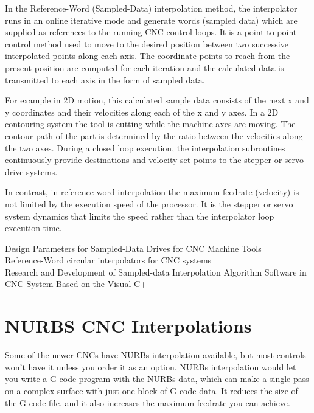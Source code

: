 In the Reference-Word (Sampled-Data) interpolation method, the interpolator runs in an online iterative mode and generate words (sampled data) which are supplied as references to the running CNC control loops. It is a point-to-point control method used to move to the desired position between two successive interpolated points along each axis. The coordinate points to reach from the present position are computed for each iteration and the calculated data is transmitted to each axis in the form of sampled data. 
\vspace*{1\baselineskip}

For example in 2D motion, this calculated sample data consists of the next x and y coordinates and their velocities along each of the x and y axes. In a 2D contouring system the tool is cutting while the machine axes are moving. The contour path of the part is determined by the ratio between the velocities along the two axes. During a closed loop execution, the interpolation subroutines continuously provide destinations and velocity set points to the stepper or servo drive systems. 
\vspace*{1\baselineskip}

In contrast, in reference-word interpolation the maximum feedrate (velocity) is not limited by the execution speed of the processor. It is the stepper or servo system dynamics that limits the speed rather than the interpolator loop execution time.
\vspace*{1\baselineskip}

\begin{tcolorbox}
	
\cite{Koren_1978} Design Parameters for Sampled-Data Drives for CNC Machine Tools\\
\cite{Koren_1982} Reference-Word circular interpolators for CNC systems\\
\cite{Yang_2018}  Research and Development of Sampled-data Interpolation Algorithm Software in CNC System Based on the Visual C++ \\

\end{tcolorbox}

\section{NURBS CNC Interpolations}

Some of the newer CNCs have NURBs interpolation available, but most controls won't have it unless you order it as an option. NURBs interpolation would let you write a G-code program with the NURBs data, which can make a single pass on a complex surface with just one block of G-code data. It reduces the size of the G-code file, and it also increases the maximum feedrate you can achieve.

